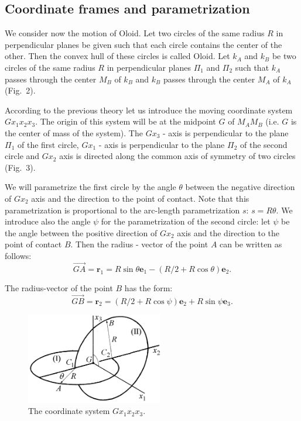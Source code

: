 \documentclass[10pt]{enoc2011}
\renewcommand{\vec}[1]{\boldsymbol{#1}}
\begin{document}
\subsection*{Coordinate frames and parametrization}

We consider now the motion of Oloid. Let two circles of the same radius $R$ in perpendicular planes be given such that each circle contains the center of the other. Then the convex hull of these circles is called Oloid. Let $k_A$ and $k_B$ be two circles of the same radius $R$ in perpendicular planes $\Pi_1$ and $\Pi_2$ such that $k_A$ passes through the center $M_B$ of $k_B$ and $k_B$ passes through the center $M_A$ of $k_A$ (Fig.~2).

According to the previous theory let us introduce the moving coordinate system $Gx_1x_2x_3$. The origin of this system will be at the midpoint $G$ of $M_AM_B$ (i.e. $G$ is the center of mass of the system). The $Gx_3$ - axis is perpendicular to the plane $\Pi_1$ of the first circle, $Gx_1$ - axis is perpendicular to the plane $\Pi_2$ of the second circle and $Gx_2$ axis is directed along the common axis of symmetry of two circles (Fig.~3).

We will parametrize the first circle by the angle $\theta$ between the negative direction of $Gx_2$ axis and the direction to the point of contact. Note that this parametrization is proportional to the arc-length parametrization $s$: $s=R\theta$. We introduce also the angle $\psi$ for the parametrization of the second circle: let $\psi$ be the angle between the positive direction of $Gx_2$ axis and the direction to the point of contact $B$. Then the radius - vector of the point $A$ can be written as follows:
$$
\overrightarrow{GA}=\vec r_1=R\sin\theta\vec e_1-\left(R/2+R\cos\theta\right)\vec e_2.
$$

The radius-vector of the point $B$ has the form:
$$
\overrightarrow{GB}=\vec r_2=\left(R/2+R\cos\psi\right)\vec e_2+R\sin\psi\vec e_3.
$$

\begin{figure}[h]
\centering\includegraphics[height=4cm]{Oloid2}
\caption{The coordinate system $Gx_1x_2x_3$.}
\end{figure}
\end{document}
